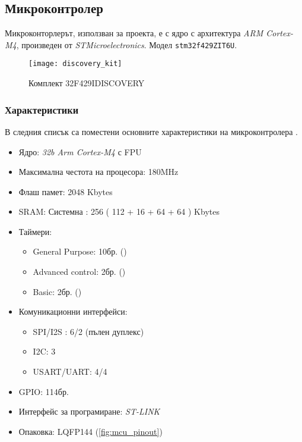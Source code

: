 \subsection{Микроконтролер}
\FloatBarrier

Микроконторлерът, използван за проекта, е с ядро с архитектура \textit{ARM Cortex-M4},
произведен от \textit{STMicroelectronics}.
Модел \texttt{stm32f429ZIT6U}.

\begin{figure}[htpb!]
    \centering
    \texttt{[image: discovery\_kit]}
    \caption{Комплект 32F429IDISCOVERY}
    \label{fig:discovery_kit}
\end{figure}

\subsubsection{Характеристики}

В следния списък са поместени основните характеристики
на микроконтролера \cite{stmmcudatasheet}.

\begin{itemize} 
    \item Ядро: \textit{32b Arm Cortex-M4} с FPU
    \item Максимална честота на процесора: 180MHz
    \item Флаш памет: 2048 Kbytes
    \item SRAM: Системна : 256 ( 112 + 16 + 64 + 64 ) Kbytes
    \item Таймери:
    \begin{itemize} 
        \item General Purpose: 10бр. ()
        \item Advanced control: 2бр. ()
        \item Basic: 2бр. ()
    \end{itemize}     
    \item Комуникационни интерфейси:
    \begin{itemize}
        \item SPI/I2S : 6/2 (пълен дуплекс) 
        \item I2C: 3
        \item USART/UART: 4/4
    \end{itemize} 
    \item GPIO: 114бр.
    \item Интерфейс за програмиране: \textit{ST-LINK}
    \item Опаковка: LQFP144 (\autoref{fig:mcu_pinout})
\end{itemize}



